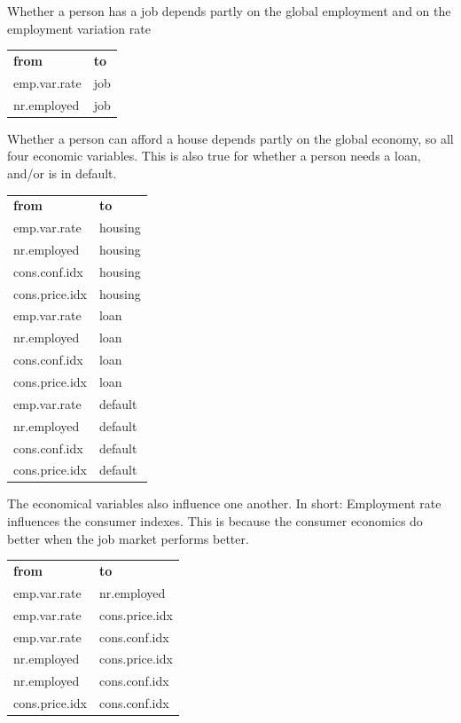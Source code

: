 \documentclass[11pt]{article}
\begin{document}
\begin{multicols}{2}
Whether a person has a job depends partly on the global employment and on the
employment variation rate

\medskip
\begin{tabular}{ll}
    \textbf{from} & \textbf{to} \\
    emp.var.rate & job\\
    nr.employed & job 
\end{tabular}

\medskip
Whether a person can afford a house depends partly on the global economy, so all
four economic variables. This is also true for whether a person needs a loan,
and/or is in default. 

\bigskip
\begin{tabular}{ll}
    \textbf{from} & \textbf{to} \\
    emp.var.rate & housing \\
    nr.employed & housing \\ 
    cons.conf.idx & housing \\ 
    \medskip
    cons.price.idx & housing \\ 
    emp.var.rate & loan \\
    nr.employed & loan \\ 
    cons.conf.idx & loan \\ 
    \medskip
    cons.price.idx & loan \\
    emp.var.rate & default \\
    nr.employed & default \\ 
    cons.conf.idx & default \\ 
    cons.price.idx & default \\ 
\end{tabular}

\bigskip
The economical variables also influence one another. In short: Employment rate
influences the consumer indexes. This is because the consumer economics do
better when the job market performs better. 

\medskip
\begin{tabular}{ll}
    \textbf{from} & \textbf{to} \\
    emp.var.rate & nr.employed \\
    emp.var.rate & cons.price.idx \\
    emp.var.rate & cons.conf.idx \\
    nr.employed & cons.price.idx \\ 
    nr.employed & cons.conf.idx \\ 
    cons.price.idx & cons.conf.idx \\ 
\end{tabular}



\end{multicols}
\end{document}
